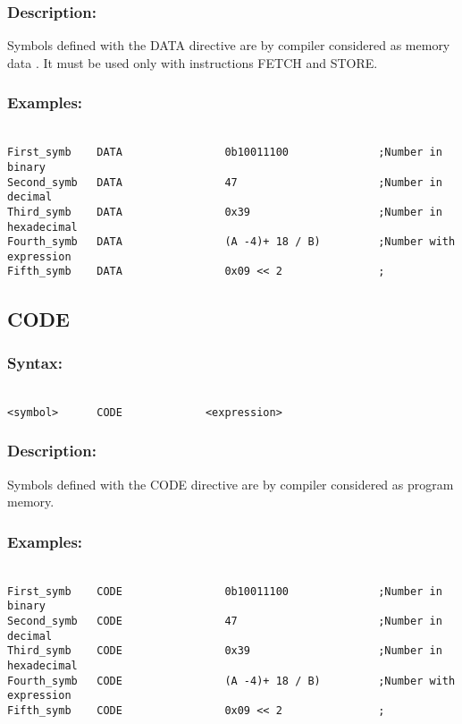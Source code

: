         \subsubsection{Description:}
            Symbols defined with the DATA directive are by compiler considered as memory data . It must be used only with instructions FETCH and STORE.

        \subsubsection{Examples:}
            {
                ~\\
                \usecodefont
                \verb'First_symb    DATA                0b10011100              ;Number in binary'\\
                \verb'Second_symb   DATA                47                      ;Number in decimal'\\
                \verb'Third_symb    DATA                0x39                    ;Number in hexadecimal'\\
                \verb'Fourth_symb   DATA                (A -4)+ 18 / B)         ;Number with expression'\\
                \verb'Fifth_symb    DATA                0x09 << 2               ;'\\
            }

    \subsection{CODE}
        \subsubsection{Syntax:}
            {
                ~\\
                \usecodefont
            \verb'<symbol>      CODE             <expression>'
            }
        \subsubsection{Description:}
        Symbols defined with the CODE directive are by compiler considered as program memory.

        \subsubsection{Examples:}
            {
                ~\\
                \usecodefont
                \verb'First_symb    CODE                0b10011100              ;Number in binary'\\
                \verb'Second_symb   CODE                47                      ;Number in decimal'\\
                \verb'Third_symb    CODE                0x39                    ;Number in hexadecimal'\\
                \verb'Fourth_symb   CODE                (A -4)+ 18 / B)         ;Number with expression'\\
                \verb'Fifth_symb    CODE                0x09 << 2               ;'\\
            }

